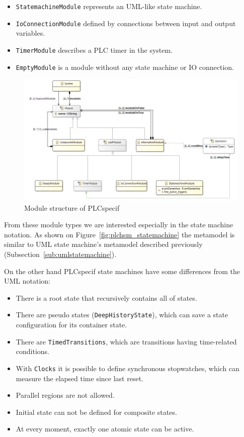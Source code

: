 \begin{itemize}
	\item \texttt{StatemachineModule} represents an UML-like state machine.
	\item \texttt{IoConnectionModule} defined by connections between input and output variables.
	\item \texttt{TimerModule} describes a PLC timer in the system.
	\item \texttt{EmptyModule} is a module without any state machine or IO connection.
\end{itemize}

\begin{figure}[htp]
\centering
\includegraphics[scale=0.45]{figures/plchsm_modules}
\caption{Module structure of PLCspecif \cite{plcspecif}}
\label{fig:plchsm_modules}
\end{figure}

From these module types we are interested especially in the state machine notation. As shown on Figure~\ref{fig:plchsm_statemachine} the metamodel is similar to UML state machine's metamodel described previously (Subsection~\ref{sub:umlstatemachine}).

On the other hand PLCspecif state machines have some differences from the UML notation:

\begin{itemize}
	\item There is a root state that recursively contains all of states.
	\item There are pseudo states (\texttt{DeepHistoryState}), which can save a state configuration for its container state.
	\item There are \texttt{TimedTransitions}, which are transitions having time-related conditions.
	\item With \texttt{Clocks} it is possible to define synchronous stopwatches, which can measure the elapsed time since last reset.
	\item Parallel regions are not allowed.
	\item Initial state can not be defined for composite states.
	\item At every moment, exactly one atomic state can be active. 
\end{itemize}

